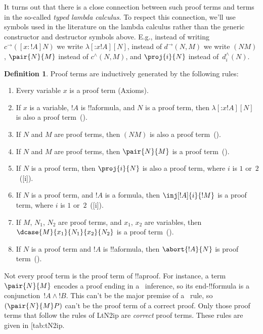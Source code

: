 \documentclass[10pt,a4paper]{article}
\makeatletter
\theoremstyle{plain}
\theoremstyle{definition}
\newtheorem{defn}[thm]{Definition}
\theoremstyle{remark}
\newcommand{\olref}{\@ifnextchar[{\olref@i}{\olref@final}}
\def\olref@i[#1]{\@ifnextchar[{\olref@ii}{\olref@final}}
\def\olref@ii[#1]{\@ifnextchar[{\olref@iii}{\olref@final}}
\def\olref@iii[#1]{\olref@final}
\def\olref@final#1{\ref{#1}}
\providecommand{\lif}{\mathbin{\rightarrow}}
\providecommand{\Log}{\ensuremath{\mathrm{L}}}
\providecommand{\lambd}{\ensuremath{\lambda}}
\providecommand{\Elim}[1]{}
\providecommand{\Intro}[1]{}
\providecommand{\typeof}{\mathord{:}}
\providecommand{\Intro}{\mathrm{I}}
\providecommand{\FalseInt}{\bot}
\providecommand{\FalseInt}{\bot}
\makeatother
\begin{document}
It turns out that there is a close connection between such proof terms
and terms in the so-called \emph{typed lambda calculus}. To respect
this connection, we'll use symbols used in the literature on the
lambda calculus rather than the generic constructor and destructor
symbols above. E.g., instead of writing $c^{\lif}([x:!A]N)$ we write
$\lambd[\typeof{x}{!A}][N]$, instead of $d^{\lif}(N,M)$ we write $(NM)$,
$\pair{N}{M}$ instead of $c^\land(N,M)$, and $\proj{i}{N}$ instead
of~$d^\land_i(N)$.

\begin{defn}
  Proof terms are inductively generated by the following rules:
  \begin{enumerate}
  \item Every variable $x$ is a proof term (Axioms).
  \item If $x$ is a variable, $!A$ is !!a{formula}, and $N$ is a proof
    term, then $\lambd[\typeof{x}{!A}][N]$ is also a proof term~(\Intro\lif).
  \item If $N$ and $M$ are proof terms, then $(NM)$ is also a proof
    term~(\Elim\lif).
  \item If $N$ and $M$ are proof terms, then $\pair{N}{M}$ is a proof
    term~(\Intro\land).
  \item If $N$ is a proof term, then $\proj{i}{N}$ is also a proof
    term, where $i$ is $1$ or~$2$~(\Elim\land[i]).
  \item If $N$ is a proof term, and $!A$ is a formula, then
    $\inj[!A]{i}{!M}$ is a proof term, where $i$ is $1$ or~$2$~(\Intro\lor[i]).
  \item If $M$, $N_1$, $N_2$ are proof terms, and $x_1$, $x_2$ are
    variables, then $\dcase{M}{x_1}{N_1}{x_2}{N_2}$ is a proof
    term~(\Elim\lor).
  \item If $N$ is a proof term and $!A$ is !!a{formula}, then
    $\abort{!A}{N}$ is proof term~(\FalseInt).
  \end{enumerate}
\end{defn}

Not every proof term is the proof term of !!a{proof}. For instance,
a term $\pair{N}{M}$ encodes a proof ending in a~\Intro{\land}
inference, so its end-!!{formula} is a conjunction~$!A \land !B$. This
can't be the major premise of a~\Elim{\lif} rule, so $(\pair{N}{M}P)$
can't be the proof term of a correct proof. Only those proof terms
that follow the rules of \Log{tN2ip} are \emph{correct} proof terms.
These rules are given in \olref{tab:tN2ip}.


\end{document}
